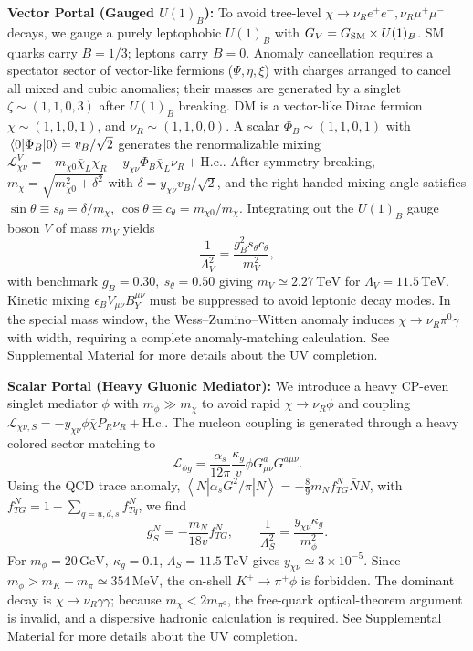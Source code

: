 \documentclass[aps,twocolumn,superscriptaddress,groupedaddress,nofootinbib,floatfix]{revtex4}
\newcommand{\MeV}{\,\mathrm{MeV}}
\newcommand{\GeV}{\,\mathrm{GeV}}
\newcommand{\TeV}{\,\mathrm{TeV}}
\begin{document}
\textbf{Vector Portal (Gauged $U(1)_B$):} To avoid tree-level $\chi\to\nu_R e^+e^-, \nu_R \mu^+\mu^-$ decays, we gauge a purely leptophobic $U(1)_B$ with $G_V=G_{\rm SM}\times U(1)_B$. SM quarks carry $B=1/3$; leptons carry $B=0$. Anomaly cancellation requires a spectator sector of vector-like fermions ($\Psi,\eta,\xi$) with charges arranged to cancel all mixed and cubic anomalies; their masses are generated by a singlet $\zeta\sim(1,1,0,3)$ after $U(1)_B$ breaking. DM is a vector-like Dirac fermion $\chi\sim(1,1,0,1)$, and $\nu_R\sim(1,1,0,0)$. A scalar $\Phi_B\sim(1,1,0,1)$ with $\vev{\Phi_B}=v_B/\sqrt2$ generates the renormalizable mixing $\mathcal{L}_{\chi\nu}^V=-m_{\chi0}\bar{\chi}_L\chi_R-y_{\chi\nu}\Phi_B\bar{\chi}_L\nu_R+\mathrm{H.c.}$. After symmetry breaking, $m_\chi=\sqrt{m_{\chi0}^2+\delta^2}$ with $\delta=y_{\chi\nu}v_B/\sqrt2$, and the right-handed mixing angle satisfies $\sin\theta\equiv s_\theta=\delta/m_\chi$, $\cos\theta\equiv c_\theta=m_{\chi0}/m_\chi$. Integrating out the $U(1)_B$ gauge boson $V$ of mass $m_V$ yields
\begin{equation}
\frac{1}{\Lambda_V^2}=\frac{g_B^2s_\theta c_\theta}{m_V^2},
\end{equation}
with benchmark $g_B=0.30,\ s_\theta=0.50$ giving $m_V\simeq2.27\TeV$ for $\Lambda_V=11.5\TeV$. Kinetic mixing $\epsilon_B V_{\mu\nu}B_Y^{\mu\nu}$ must be suppressed to avoid leptonic decay modes. In the special mass window, the Wess–Zumino–Witten anomaly induces $\chi\to\nu_R\pi^0\gamma$ with width, requiring a complete anomaly-matching calculation. See Supplemental Material for more details about the UV completion.


\textbf{Scalar Portal (Heavy Gluonic Mediator):} We introduce a heavy CP-even singlet mediator $\phi$ with $m_\phi\gg m_\chi$ to avoid rapid $\chi\to\nu_R\phi$ and coupling $\mathcal{L}_{\chi\nu,S}=-y_{\chi\nu}\phi\bar{\chi}P_R\nu_R+\mathrm{H.c.}$. The nucleon coupling is generated through a heavy colored sector matching to
\begin{equation}
\mathcal{L}_{\phi g}=\frac{\alpha_s}{12\pi}\frac{\kappa_g}{v}\phi G_{\mu\nu}^aG^{a\mu\nu}.
\end{equation}
Using the QCD trace anomaly, $\left\langle N|\alpha_s G^2/\pi|N\right\rangle=-\frac{8}{9}m_N f_{TG}^N\bar NN$, with $f_{TG}^N=1-\sum_{q=u,d,s}f_{Tq}^N$, we find
\begin{equation}
g_S^N=-\frac{m_N}{18v}f_{TG}^N,\qquad \frac{1}{\Lambda_S^2}=\frac{y_{\chi\nu}\kappa_g}{m_\phi^2}.
\end{equation}
For $m_\phi=20\GeV,\ \kappa_g=0.1$, $\Lambda_S=11.5\TeV$ gives $y_{\chi\nu}\simeq3\times10^{-5}$. Since $m_\phi>m_K-m_\pi\simeq354\MeV$, the on-shell $K^+\to\pi^+\phi$ is forbidden. The dominant decay is $\chi\to\nu_R\gamma\gamma$; because $m_\chi<2m_{\pi^0}$, the free-quark optical-theorem argument is invalid, and a dispersive hadronic calculation is required. See Supplemental Material for more details about the UV completion. 
\end{document}
